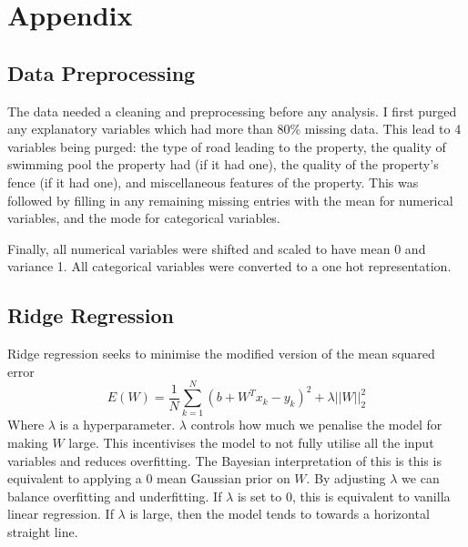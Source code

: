 \documentclass[10pt, letterpaper, twoside]{article}
\begin{document}
\appendix
\section{Appendix}
\subsection{Data Preprocessing}
The data needed a cleaning and preprocessing before any analysis. I first purged any explanatory variables which had more than 80\% missing data. This lead to 4 variables being purged: the type of road leading to the property, the quality of swimming pool the property had (if it had one), the quality of the property's fence (if it had one), and miscellaneous features of the property. This was followed by filling in any remaining missing entries with the mean for numerical variables, and the mode for categorical variables.

Finally, all numerical variables were shifted and scaled to have mean 0 and variance 1. All categorical variables were converted to a one hot representation.

\subsection{Ridge Regression}
Ridge regression seeks to minimise the modified version of the mean squared error
\[E(W) = \frac{1}{N} \sum_{k=1}^N (b + W^T x_k - y_k)^2 + \lambda ||W||_2^2\]
Where $\lambda$ is a hyperparameter. $\lambda$ controls how much we penalise the model for making $W$ large. This incentivises the model to not fully utilise all the input variables and reduces overfitting. The Bayesian interpretation of this is this is equivalent to applying a 0 mean Gaussian prior on $W$. By adjusting $\lambda$ we can balance overfitting and underfitting. If $\lambda$ is set to 0, this is equivalent to vanilla linear regression. If $\lambda$ is large, then the model tends to towards a horizontal straight line. 
\end{document}
